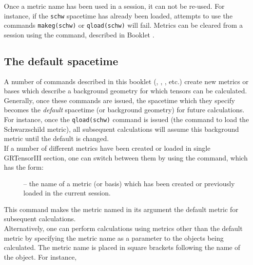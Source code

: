 \documentclass{article}
\begin{document}
Once a metric name has been used in a session, it can not be
re-used. For instance, if the \texttt{schw} spacetime has already been
loaded, attempts to use the commands \texttt{makeg(schw)} or
\texttt{qload(schw)} will fail. Metrics can be cleared from a session
using the  command, described in Booklet \grCalcRef.
%
\subsection{The default spacetime} \label{sec:default}
%
A number of commands described in this booklet (,
, , etc.) create new metrics or bases
which describe a background geometry for which tensors can be
calculated. Generally, once these commands are issued, the spacetime
which they specify becomes the \textit{default} spacetime (or
background geometry) for future calculations. For instance, once the
\mbox{\texttt{qload(schw)}} command is issued (the command to load
the Schwarzschild metric), all subsequent calculations will assume
this background metric until the default is changed.\\

If a number of different metrics have been created or loaded in single
GRTensorIII section, one can switch between them by using the 
command, which has the form:\\
%
\begin{cmdspec}
  \label{spec:grmetric}

  \begin{description}
    \item[] -- the name of a metric (or basis) which has been
      created or previously loaded in the current session.
  \end{description}

\end{cmdspec}

This command makes the metric named in its argument the default metric
for subsequent calculations.\\

Alternatively, one can perform calculations using metrics other than
the default metric by specifying the metric name as a parameter to the
objects being calculated. The metric name is placed in square brackets
following the name of the object. For instance,\\
\end{document}
